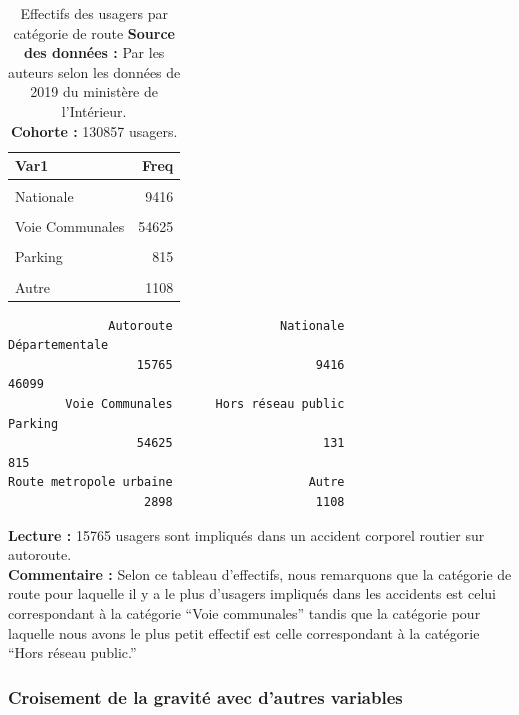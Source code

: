 \documentclass[french,]{tp}
\begin{document}
\begin{table}[H]

\caption{\label{tab:tablecatr}Effectifs des usagers par catégorie de route
\textbf{Source des données :} Par les auteurs selon les données de 2019 du ministère de l'Intérieur.\\
\textbf{Cohorte :} 130857 usagers.\\}
\centering
\begin{tabular}[t]{lr}
\toprule
\textbf{Var1} & \textbf{Freq}\\
\midrule
\cellcolor{gray!6}{Autoroute} & \cellcolor{gray!6}{15765}\\
Nationale & 9416\\
\cellcolor{gray!6}{Départementale} & \cellcolor{gray!6}{46099}\\
Voie Communales & 54625\\
\cellcolor{gray!6}{Hors réseau public} & \cellcolor{gray!6}{131}\\
\addlinespace
Parking & 815\\
\cellcolor{gray!6}{Route metropole urbaine} & \cellcolor{gray!6}{2898}\\
Autre & 1108\\
\bottomrule
\end{tabular}
\end{table}

\begin{verbatim}
              Autoroute               Nationale          Départementale 
                  15765                    9416                   46099 
        Voie Communales      Hors réseau public                 Parking 
                  54625                     131                     815 
Route metropole urbaine                   Autre 
                   2898                    1108 
\end{verbatim}

\textbf{Lecture :} 15765 usagers sont impliqués dans un accident corporel routier sur autoroute.\\
\textbf{Commentaire :} Selon ce tableau d'effectifs, nous remarquons que la catégorie de route pour laquelle il y a le plus d'usagers impliqués dans les accidents est celui correspondant à la catégorie ``Voie communales'' tandis que la catégorie pour laquelle nous avons le plus petit effectif est celle correspondant à la catégorie ``Hors réseau public.''

\newpage

\hypertarget{crois-grav}{%
\subsubsection{Croisement de la gravité avec d'autres variables}\label{crois-grav}}
\end{document}
